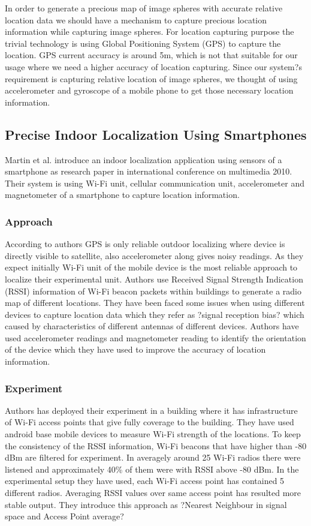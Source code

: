 In order to generate a precious map of image spheres with accurate relative location data we should have a mechanism to capture precious location information while capturing image spheres. For location capturing purpose the trivial technology is using Global Positioning System (GPS) to capture the location. GPS current accuracy is around 5m, which is not that suitable for our usage where we need a higher accuracy of location capturing. Since our system?s requirement is capturing relative location of image spheres, we thought of using accelerometer and gyroscope of a mobile phone to get those necessary location information.

\subsection{Precise Indoor Localization Using Smartphones}
Martin et al. introduce an indoor localization application \cite{48} using sensors of a smartphone as research paper in international conference on multimedia 2010. Their system is using Wi-Fi unit, cellular communication unit, accelerometer and magnetometer of a smartphone to capture location information.

\subsubsection{Approach}
According to authors GPS is only reliable outdoor localizing where device is directly visible to satellite, also accelerometer along gives noisy readings. As they expect initially Wi-Fi unit of the mobile device is the most reliable approach to localize their experimental unit. Authors use Received Signal Strength Indication (RSSI) information of Wi-Fi beacon packets within buildings to generate a radio map of different locations. They have been faced some issues when using different devices to capture location data which they refer as ?signal reception bias? which caused by characteristics of different antennas of different devices. Authors have used accelerometer readings and magnetometer reading to identify the orientation of the device which they have used to improve the accuracy of location information.

\subsubsection{Experiment}
Authors has deployed their experiment in a building where it has infrastructure of Wi-Fi access points that give fully coverage to the building. They have used android base mobile devices to measure Wi-Fi strength of the locations. To keep the consistency of the RSSI information, Wi-Fi beacons that have higher than -80 dBm are filtered for experiment. In averagely around 25 Wi-Fi radios there were listened and approximately 40\% of them were with RSSI above -80 dBm.
In the experimental setup they have used, each Wi-Fi access point has contained 5 different radios. Averaging RSSI values over same access point has resulted more stable output. They introduce this approach as ?Nearest Neighbour in signal space and Access Point average?

